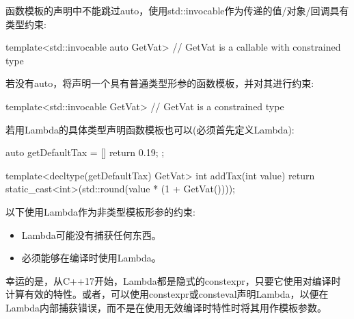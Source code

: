 函数模板的声明中不能跳过auto，使用std::invocable作为传递的值/对象/回调具有类型约束:

\begin{cpp}
template<std::invocable auto GetVat> // GetVat is a callable with constrained type
\end{cpp}

若没有auto，将声明一个具有普通类型形参的函数模板，并对其进行约束:

\begin{cpp}
template<std::invocable GetVat> // GetVat is a constrained type
\end{cpp}

若用Lambda的具体类型声明函数模板也可以(必须首先定义Lambda):

\begin{cpp}
auto getDefaultTax = [] {
	return 0.19;
};

template<decltype(getDefaultTax) GetVat>
int addTax(int value)
{
	return static_cast<int>(std::round(value * (1 + GetVat())));
}
\end{cpp}

以下使用Lambda作为非类型模板形参的约束:

\begin{itemize}
\item
Lambda可能没有捕获任何东西。

\item
必须能够在编译时使用Lambda。
\end{itemize}

幸运的是，从C++17开始，Lambda都是隐式的constexpr，只要它使用对编译时计算有效的特性。或者，可以使用constexpr或consteval声明Lambda，以便在Lambda内部捕获错误，而不是在使用无效编译时特性时将其用作模板参数。









